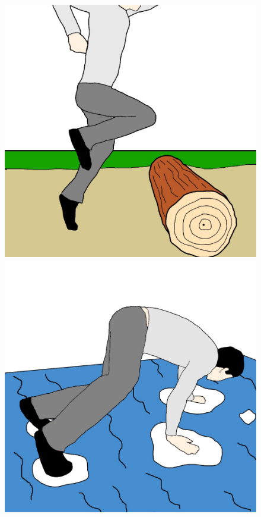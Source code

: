 \documentclass[twocolumn,showpacs,%
  nofootinbib,aps,superscriptaddress,%
  eqsecnum,prd,notitlepage,showkeys,10pt]{revtex4-1}
\begin{document}
\begin{figure}[!htb]
  \includegraphics[width=\linewidth]{graphics/Image.jpg}
\endminipage\hfill
{}
  \includegraphics[width=\linewidth]{graphics/Image(2).jpg}

\end{figure}
\end{document}
